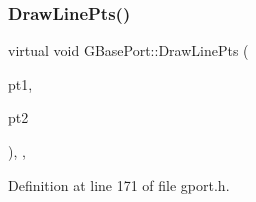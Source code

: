 \subsubsection{\texorpdfstring{Draw\+Line\+Pts()}{DrawLinePts()}}
{\footnotesize\ttfamily virtual void G\+Base\+Port\+::\+Draw\+Line\+Pts (\begin{DoxyParamCaption}\item[{const \mbox{\hyperlink{class_g_point}{G\+Point}} \&}]{pt1,  }\item[{const \mbox{\hyperlink{class_g_point}{G\+Point}} \&}]{pt2 }\end{DoxyParamCaption})\hspace{0.3cm}{\ttfamily [inline]}, {\ttfamily [virtual]}, {\ttfamily [inherited]}}



Definition at line 171 of file gport.\+h.


